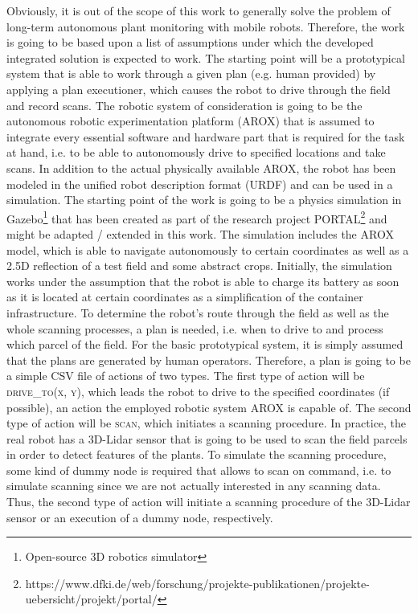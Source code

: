 \documentclass[english, master, expose, utf8]{base/thesis_KBS}
\begin{document}
Obviously, it is out of the scope of this work to generally solve the problem of long-term autonomous plant monitoring with mobile robots.
Therefore, the work is going to be based upon a list of assumptions under which the developed integrated solution is expected to work.
The starting point will be a prototypical system that is able to work through a given plan (e.g. human provided) by applying a plan executioner,
which causes the robot to drive through the field and record scans.
The robotic system of consideration is going to be the autonomous robotic experimentation platform (AROX) \cite{Kisliuk:2021} that is assumed to integrate every
essential software and hardware part that is required for the task at hand, i.e. to be able to autonomously drive to specified locations and take scans.
In addition to the actual physically available AROX, the robot has been modeled in the unified robot description format (URDF) and can be used in a simulation.
The starting point of the work is going to be a physics simulation in Gazebo\footnote{Open-source 3D robotics simulator} that has been created as part of the research project 
PORTAL\footnote{https://www.dfki.de/web/forschung/projekte-publikationen/projekte-uebersicht/projekt/portal/} and might be adapted / extended in this work.
The simulation includes the AROX model, which is able to navigate autonomously to certain coordinates as well as a 2.5D  reflection of a test field and some abstract crops.
Initially, the simulation works under the assumption that the robot is able to charge its battery as soon as it is located at certain coordinates as a simplification
of the container infrastructure.\newline
To determine the robot's route through the field as well as the whole scanning processes, a plan is needed, i.e. when to drive to and process which parcel of the field. 
For the basic prototypical system, it is simply assumed that the plans are generated by human operators. Therefore, a plan is going to be a simple CSV file of actions of two types.
The first type of action will be \textsc{drive\_to(x, y)}, which leads the robot to drive to the specified coordinates (if possible), an action the employed robotic system 
AROX is capable of. The second type of action will be \textsc{scan}, which initiates a scanning procedure. In practice, the real robot has a 3D-Lidar sensor that is going 
to be used to scan the field parcels in order to detect features of the plants. To simulate the scanning procedure, some kind of dummy node is required that allows to 
scan on command, i.e. to simulate scanning since we are not actually interested in any scanning data. Thus, the second type of action will initiate a scanning procedure of
the 3D-Lidar sensor or an execution of a dummy node, respectively.
\end{document}
